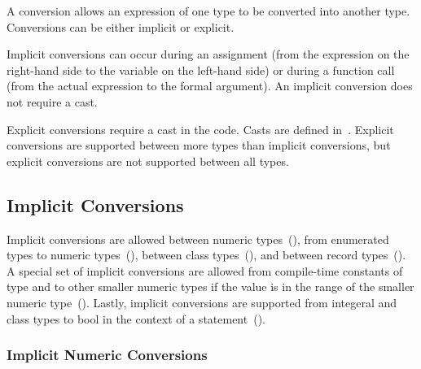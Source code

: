 \label{Conversions}

A conversion allows an expression of one type to be converted into
another type.  Conversions can be either implicit or explicit.

Implicit conversions can occur during an assignment (from the
expression on the right-hand side to the variable on the left-hand
side) or during a function call (from the actual expression to the
formal argument).  An implicit conversion does not require a cast.

Explicit conversions require a cast in the code.  Casts are defined
in~.  Explicit conversions are supported between more
types than implicit conversions, but explicit conversions are not
supported between all types.

\subsection{Implicit Conversions}
\label{Implicit_Conversions}

Implicit conversions are allowed between numeric
types~(), from enumerated types to
numeric types~(), between class
types~(), and between record
types~().  A special set of implicit
conversions are allowed from compile-time constants of type 
and  to other smaller numeric types if the value is in
the range of the smaller numeric
type~().  Lastly,
implicit conversions are supported from integeral and class types to
bool in the context of a
statement~().

\subsubsection{Implicit Numeric Conversions}
\label{Implicit_Numeric_Conversions}

